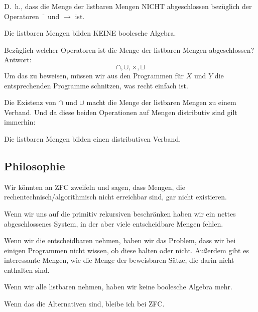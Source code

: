 \documentclass[a4paper]{amsart}
\theoremstyle{definition}
\begin{document}
D.~h., dass die Menge der listbaren Mengen NICHT abgeschlossen bezüglich der Operatoren $\overline{\phantom{x}}$ und $\rightarrow$ ist. 

{\color{red}Die listbaren Mengen bilden KEINE boolesche Algebra.} 

Bezüglich welcher Operatoren ist die Menge der listbaren Mengen abgeschlossen? Antwort:
\begin{equation}\label{listbareOperatoren}
   \cap, \cup, \times, \sqcup
\end{equation}
Um das zu beweisen, müssen wir aus den Programmen für $X$ und $Y$ die entsprechenden Programme schnitzen, was recht einfach ist.

Die Existenz von $\cap$ und $\cup$ macht die Menge der listbaren Mengen zu einem Verband. Und da diese beiden Operationen auf Mengen distributiv sind gilt immerhin:

{\color{red}Die listbaren Mengen bilden einen distributiven Verband.}

\subsection{Philosophie}
Wir könnten an ZFC zweifeln und sagen, dass Mengen, die rechentechnisch/algorithmisch nicht erreichbar sind, gar nicht existieren.

Wenn wir uns auf die primitiv rekursiven beschränken haben wir ein nettes abgeschlossenes System, in der aber viele entscheidbare Mengen fehlen.

Wenn wir die entscheidbaren nehmen, haben wir das Problem, dass wir bei einigen Programmen nicht wissen, ob diese halten oder nicht. Außerdem gibt es interessante Mengen, wie die Menge der beweisbaren Sätze, die darin nicht enthalten sind.

Wenn wir alle listbaren nehmen, haben wir keine boolesche Algebra mehr.

Wenn das die Alternativen sind, bleibe ich bei ZFC.
\end{document}
